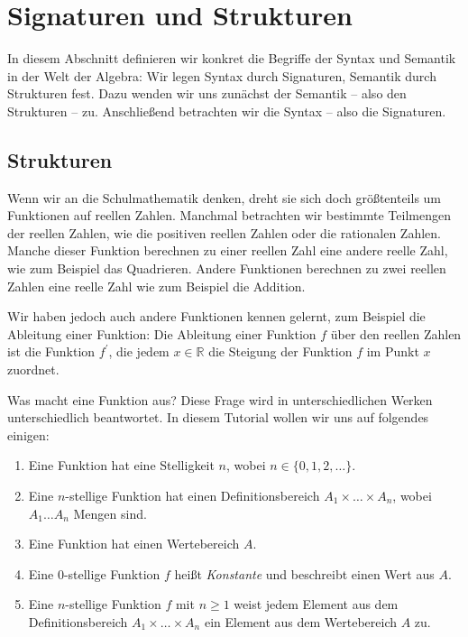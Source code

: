 \documentclass{article}
\begin{document}
\section{Signaturen und Strukturen}

In diesem Abschnitt definieren wir konkret die Begriffe der Syntax und Semantik 
in der Welt der Algebra: Wir legen Syntax durch Signaturen, Semantik 
durch Strukturen fest. Dazu wenden wir uns zunächst der Semantik -- also den 
Strukturen -- zu. Anschließend betrachten wir die Syntax -- also die 
Signaturen. 

\subsection{Strukturen}

Wenn wir an die Schulmathematik denken, dreht sie sich doch größtenteils um 
Funktionen auf reellen Zahlen. Manchmal betrachten wir bestimmte Teilmengen der 
reellen Zahlen, wie die positiven reellen Zahlen oder die rationalen Zahlen. 
Manche dieser Funktion berechnen zu einer reellen Zahl eine andere reelle Zahl, 
wie zum Beispiel das Quadrieren. Andere Funktionen berechnen 
zu zwei reellen Zahlen eine reelle Zahl wie zum Beispiel die Addition. 

Wir haben jedoch auch andere Funktionen kennen gelernt, zum Beispiel die 
Ableitung einer Funktion: Die Ableitung einer Funktion $f$ über den reellen 
Zahlen ist die Funktion $f^\prime$, die jedem $x\in\mathds{R}$ die Steigung der 
Funktion $f$ im Punkt $x$ zuordnet. 

Was macht eine Funktion aus? Diese Frage wird in unterschiedlichen Werken 
unterschiedlich beantwortet. In diesem Tutorial wollen wir uns auf 
folgendes einigen: 
\begin{enumerate}
 \item Eine Funktion hat eine Stelligkeit $n$, wobei $n\in\{0,1,2,\ldots\}$.
 \item Eine $n$-stellige Funktion hat einen Definitionsbereich 
$A_1\times\ldots\times A_n$, wobei $A_1\ldots A_n$ Mengen sind. 
 \item Eine Funktion hat einen Wertebereich $A$. 
 \item Eine $0$-stellige Funktion $f$ heißt \emph{Konstante} und beschreibt 
einen Wert aus $A$. 
 \item Eine $n$-stellige Funktion $f$ mit $n \geq 1$ weist jedem Element aus 
dem Definitionsbereich $A_1\times\ldots\times A_n$ ein Element aus dem 
Wertebereich $A$ zu.
 \end{enumerate}
\end{document}
